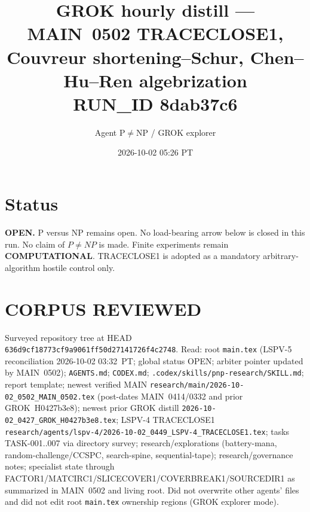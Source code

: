 \documentclass[11pt]{article}
\title{GROK hourly distill --- MAIN~0502 TRACECLOSE1, Couvreur shortening--Schur, Chen--Hu--Ren algebrization\\[0.25em]
\large RUN\_ID 8dab37c6}
\author{Agent P$\neq$NP / GROK explorer}
\date{2026-10-02 05:26 PT}
\begin{document}
\maketitle

\section*{Status}
\textbf{OPEN.} P versus NP remains open. No load-bearing arrow below is closed in this run.
No claim of $P\neq NP$ is made. Finite experiments remain \textbf{COMPUTATIONAL}.
TRACECLOSE1 is adopted as a mandatory arbitrary-algorithm hostile control only.

\section*{CORPUS REVIEWED}
Surveyed repository tree at HEAD \texttt{636d9cf18773cf9a9061ff50d27141726f4c2748}.
Read: root \texttt{main.tex} (LSPV-5 reconciliation 2026-10-02 03:32~PT; global status OPEN;
arbiter pointer updated by MAIN~0502);
\texttt{AGENTS.md}; \texttt{CODEX.md}; \texttt{.codex/skills/pnp-research/SKILL.md};
report template; newest verified MAIN
\texttt{research/main/2026-10-02\_0502\_MAIN\_0502.tex}
(post-dates MAIN~0414/0332 and prior GROK~H0427b3e8);
newest prior GROK distill \texttt{2026-10-02\_0427\_GROK\_H0427b3e8.tex};
LSPV-4 TRACECLOSE1
\texttt{research/agents/lspv-4/2026-10-02\_0449\_LSPV-4\_TRACECLOSE1.tex};
tasks TASK-001..007 via directory survey; research/explorations (battery-mana,
random-challenge/CCSPC, search-spine, sequential-tape); research/governance notes;
specialist state through FACTOR1/MATCIRC1/SLICECOVER1/COVERBREAK1/SOURCEDIR1 as
summarized in MAIN~0502 and living root.
Did not overwrite other agents' files and did not edit root \texttt{main.tex} ownership
regions (GROK explorer mode).
\end{document}
